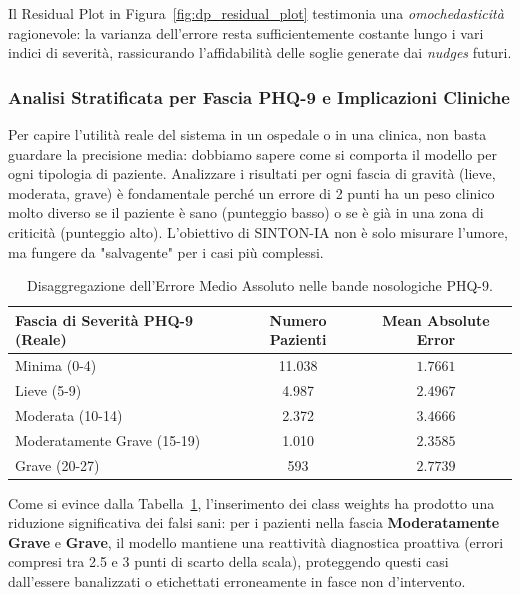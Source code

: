 Il Residual Plot in Figura~\ref{fig:dp_residual_plot} testimonia una \textit{omochedasticità} ragionevole: la varianza dell'errore resta sufficientemente costante lungo i vari indici di severità, rassicurando l'affidabilità delle soglie generate dai \textit{nudges} futuri.

\subsubsection*{Analisi Stratificata per Fascia PHQ-9 e Implicazioni Cliniche}
Per capire l'utilità reale del sistema in un ospedale o in una clinica, non basta guardare la precisione media: dobbiamo sapere come si comporta il modello per ogni tipologia di paziente. Analizzare i risultati per ogni fascia di gravità (lieve, moderata, grave) è fondamentale perché un errore di 2 punti ha un peso clinico molto diverso se il paziente è sano (punteggio basso) o se è già in una zona di criticità (punteggio alto). L'obiettivo di SINTON-IA non è solo misurare l'umore, ma fungere da "salvagente" per i casi più complessi.

\begin{table}[H]
    \centering
    \begin{tabular}{|l|c|c|}
        \hline
        \textbf{Fascia di Severità PHQ-9 (Reale)} & \textbf{Numero Pazienti} & \textbf{Mean Absolute Error} \\
        \hline
        Minima (0-4)                              & 11.038                   & $1.7661$                     \\
        Lieve (5-9)                               & 4.987                    & $2.4967$                     \\
        Moderata (10-14)                          & 2.372                    & $3.4666$                     \\
        Moderatamente Grave (15-19)               & 1.010                    & $2.3585$                     \\
        Grave (20-27)                             & 593                      & $2.7739$                     \\
        \hline
    \end{tabular}
    \caption{Disaggregazione dell'Errore Medio Assoluto nelle bande nosologiche PHQ-9.}
    \label{tab:mae_by_band}
\end{table}

Come si evince dalla Tabella~\ref{tab:mae_by_band}, l'inserimento dei class weights ha prodotto una riduzione significativa dei falsi sani: per i pazienti nella fascia \textbf{Moderatamente Grave} e \textbf{Grave}, il modello mantiene una reattività diagnostica proattiva (errori compresi tra 2.5 e 3 punti di scarto della scala), proteggendo questi casi dall'essere banalizzati o etichettati erroneamente in fasce non d'intervento.

